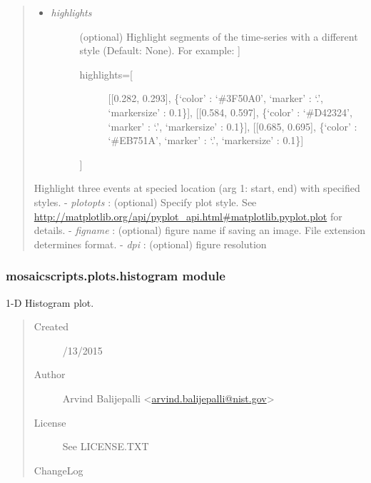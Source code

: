 \documentclass[letterpaper,10pt,english]{sphinxmanual}
\begin{document}
\begin{fulllineitems}
\begin{quote}
\begin{description}
\begin{itemize}
\item {} \begin{description}
\item[{\emph{highlights}}] \leavevmode{[}(optional) Highlight segments of the time-series with a different style (Default: None). For example: {]}\begin{description}
\item[{highlights={[}}] \leavevmode
{[}{[}0.282, 0.293{]}, \{`color' : `\#3F50A0', `marker' : `.', `markersize' : 0.1\}{]},
{[}{[}0.584, 0.597{]}, \{`color' : `\#D42324', `marker' : `.', `markersize' : 0.1\}{]},
{[}{[}0.685, 0.695{]}, \{`color' : `\#EB751A', `marker' : `.', `markersize' : 0.1\}{]}

\end{description}

{]}

\end{description}

\end{itemize}

Highlight three events at specied location (arg 1: start, end) with specified styles.
- \emph{plotopts} :          (optional) Specify plot style. See \href{http://matplotlib.org/api/pyplot\_api.html\#matplotlib.pyplot.plot}{http://matplotlib.org/api/pyplot\_api.html\#matplotlib.pyplot.plot} for details.
- \emph{figname} :                           (optional) figure name if saving an image. File extension determines format.
- \emph{dpi} :                                       (optional) figure resolution

\end{description}\end{quote}

\end{fulllineitems}



\subsubsection{mosaicscripts.plots.histogram module}
\label{api-doc/mosaicscripts:module-mosaicscripts.plots.histogram}\label{api-doc/mosaicscripts:mosaicscripts-plots-histogram-module}
1-D Histogram plot.
\begin{quote}\begin{description}
\item[{Created}] /13/2015

\item[{Author}] \leavevmode
Arvind Balijepalli \textless{}\href{mailto:arvind.balijepalli@nist.gov}{arvind.balijepalli@nist.gov}\textgreater{}

\item[{License}] \leavevmode
See LICENSE.TXT

\item[{ChangeLog}] \leavevmode
\end{description}\end{quote}
\end{document}
